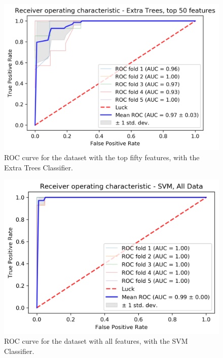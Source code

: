 \begin{figure}[H]
	\centering
	\includegraphics[width=5in]{../images/results/ET_top50.png}
	\caption{ROC curve for the dataset with the top fifty features, with the Extra Trees Classifier.} 
	\label{fig:ET_top}
\end{figure}

\begin{figure}[H]
	\centering
	\includegraphics[width=5in]{../images/results/svm_all.png}
	\caption{ROC curve for the dataset with all features, with the SVM Classifier.} 
	\label{fig:svm_all}
\end{figure}

